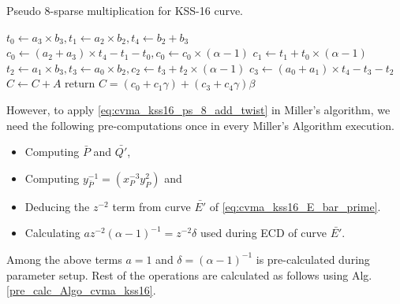 \vspace{0.6em}
\begin{algorithm}[ht]
	\caption{Pseudo 8-sparse multiplication for KSS-16 curve.}
	\label{algo_sparse_mul_kss16_cvma}
	\DontPrintSemicolon
	
	
	 $t_0 \leftarrow a_3 \times b_3, t_1 \leftarrow a_2\times b_2,  t_4\leftarrow b_2+b_3$  
	 $c_0 \leftarrow (a_2+a_3) \times t_4-t_1-t_0, c_0 \leftarrow c_0 \times (\alpha-1)$ 
	 $c_1\leftarrow t_1+ t_0 \times (\alpha-1)$\;
	 $t_2\leftarrow a_1\times b_3 ,t_3\leftarrow a_0\times b_2, c_2\leftarrow t_3+t_2 \times (\alpha-1)$ 
	 $ c_3 \leftarrow (a_0+a_1)\times t_4-t_3 - t_2 $  
	 $C \leftarrow C+A$\;
	 return $C=(c_0+c_1\gamma)+(c_3+c_4\gamma)\beta$  
\end{algorithm}
\vspace{0.8mm}
However, to apply \eqref{eq:cvma_kss16_ps_8_add_twist} in Miller's algorithm, we need the following pre-computations once in every Miller's Algorithm execution.
\begin{itemize}
	\item Computing $\bar{P}$ and $\bar{Q'}$,
	\item Computing $y_{\bar{P}}^{-1}=(x_{P}^{-3} y_{P}^{2})$ and
	\item Deducing the $z^{-2}$ term from curve $\bar{E'}$ of \eqref{eq:cvma_kss16_E_bar_prime}.
	\item Calculating $az^{-2}(\alpha-1)^{-1} = z^{-2}\delta$ used during ECD of curve $\bar{E'}$.
\end{itemize}
Among the above terms $a=1$ and $\delta=(\alpha-1)^{-1}$ is pre-calculated during parameter setup. Rest of the operations are calculated as follows using Alg. \ref{pre_calc_Algo_cvma_kss16}.
